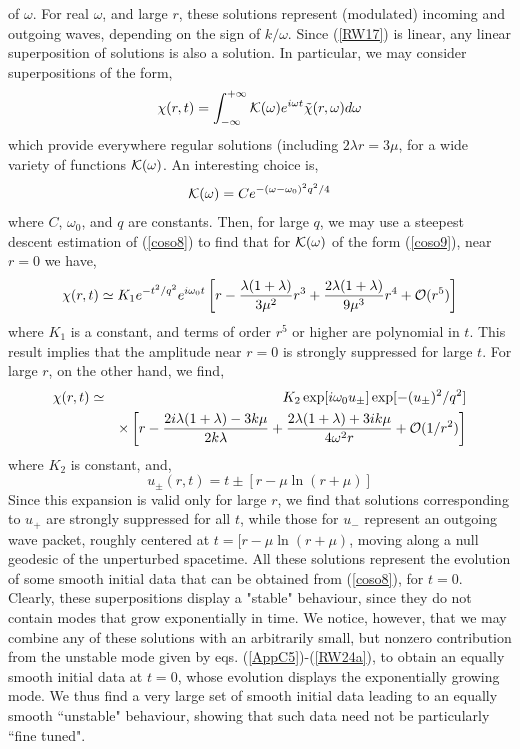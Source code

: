 \documentclass[12pt,aps,floats,showpacs,amssymb,tightenlines]{revtex4}
\begin{document}
of $\omega$. For real $\omega$, and large $r$, these solutions
represent (modulated) incoming and outgoing waves, depending on the
sign of $k/\omega$. Since (\ref{RW17}) is linear, any linear
superposition of solutions is also a solution. In particular, we may
consider superpositions of the form,
\begin{equation} \label{coso8}
\chi(r,t)=\int_{-\infty}^{+\infty}{{\cal{K}}(\omega) e^{i \omega
t}\tilde{\chi}(r,\omega) d\omega} \end{equation} which provide
everywhere regular solutions (including $2\lambda r=3\mu$, for a
wide variety of functions ${\cal{K}}(\omega)$. An interesting choice
is, \begin{equation} \label{coso9} {\cal{K}}(\omega)= C
e^{-(\omega-\omega_0)^2  q^2/4} \end{equation} where $C$,
$\omega_0$, and $q$ are constants. Then, for large $q$, we may use a
steepest descent estimation of (\ref{coso8}) to find that for
${\cal{K}}(\omega)$ of the form (\ref{coso9}), near $r=0$ we have,
\begin{equation} \label{RW170} \chi(r,t) \simeq K_1 e^{-t^2/q^2}
e^{i \omega_0 t}\left[r - \frac{\lambda(1+\lambda)}{3 \mu^2} r^3+
\frac{2\lambda(1+\lambda)}{9 \mu^3} r^4 + {\cal{O}}(r^5)\right]
\end{equation} where $K_1$ is a constant, and terms of order $r^5$
or higher are polynomial in $t$. This result implies that the
amplitude near $r=0$ is strongly suppressed for large $t$. For large
$r$, on the other hand, we find, \begin{eqnarray} \label{RW171}
\chi(r,t) & \simeq & K_2 \exp[i \omega_0
u_{\pm}]\exp[-(u_{\pm})^2/q^2] \nonumber \\ & & \times \left[r -
\frac{2 i \lambda(1+\lambda) -3 k \mu}{2 k \lambda}   +\frac{2
\lambda(1+\lambda) + 3 i k \mu}{4 \omega^2 r}
+{\cal{O}}(1/r^2)\right] \end{eqnarray} where $K_2$ is constant,
and, \begin{equation} \label{RW172} u_{\pm}(r,t)= t \pm
[r-\mu\ln(r+\mu)] \end{equation} Since this expansion is valid only
for large $r$, we find that solutions corresponding to $u_+$ are
strongly suppressed for all $t$, while those for $u_-$ represent an
outgoing wave packet, roughly centered at $t = [r-\mu\ln(r+\mu)$,
moving along a null geodesic of the unperturbed spacetime. All these
solutions represent the evolution of some smooth initial data that
can be obtained from (\ref{coso8}), for $t=0$. Clearly, these
superpositions display a "stable" behaviour, since they do not
contain modes that grow exponentially in time. We notice, however,
that we may combine any of these solutions with an arbitrarily
small, but nonzero contribution from the unstable mode given by eqs.
(\ref{AppC5})-(\ref{RW24a}), to obtain an equally smooth initial
data at $t=0$, whose evolution displays the exponentially growing
mode. We thus find a very large set of smooth initial data leading
to an equally smooth ``unstable" behaviour, showing that such data
need not be
particularly ``fine tuned".\\
\end{document}
